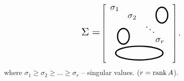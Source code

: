     \[
        \scalebox{1.5}{$\Sigma = $}
        \left[\begin{tabular}{clp{0.1cm}p{0.1cm}}
            \multicolumn{1}{l}{\scalebox{1.25}{$\sigma_1$}}        &         & & \multicolumn{1}{l}{\multirow{3}{*}{\begin{tikzpicture}[x=0.55pt,y=0.55pt,yscale=-1,xscale=1]
                    \draw  [line width=1.75]  (304.32,138.5) .. controls (312.66,138.5) and (319.43,147.68) .. (319.43,159) .. controls (319.43,170.32) and (312.66,179.5) .. (304.32,179.5) .. controls (295.98,179.5) and (289.21,170.32) .. (289.21,159) .. controls (289.21,147.68) and (295.98,138.5) .. (304.32,138.5) -- cycle ;
                    \end{tikzpicture}}} \\ %
\multicolumn{1}{l}{}         & \scalebox{1.25}{$\sigma_2$}       & \multicolumn{1}{c}{} & \multicolumn{1}{c}{}                     \\ %
            \multicolumn{2}{c}{\multirow{2}{*}{
                \begin{tikzpicture}[x=0.55pt,y=0.55pt,yscale=-1,xscale=1]
                    \draw  [line width=1.75]  (304.32,138.5) .. controls (312.66,138.5) and (319.43,147.68) .. (319.43,159) .. controls (319.43,170.32) and (312.66,179.5) .. (304.32,179.5) .. controls (295.98,179.5) and (289.21,170.32) .. (289.21,159) .. controls (289.21,147.68) and (295.98,138.5) .. (304.32,138.5) -- cycle ;
                    \end{tikzpicture}
            }} & \scalebox{1.25}{$\ddots$}              & \multicolumn{1}{l}{}  \\ %
            \multicolumn{2}{c}{}                   &                       & \multicolumn{1}{l}{\scalebox{1.25}{$\sigma_r$}}   \\[0.05cm] %
 
            \multicolumn{4}{c}{\begin{tikzpicture}[x=0.55pt,y=0.55pt,yscale=-1,xscale=1]
                \draw [line width=1.75]  (246,143.5) .. controls (246,133.56) and (273.41,125.5) .. (307.21,125.5) .. controls (341.02,125.5) and (368.43,133.56) .. (368.43,143.5) .. controls (368.43,153.44) and (341.02,161.5) .. (307.21,161.5) .. controls (273.41,161.5) and (246,153.44) .. (246,143.5) -- cycle ;
                \end{tikzpicture}
                }                                                                        
            \end{tabular}\right],
    \]
    where $\sigma_1 \geq \sigma_2 \geq \ldots \geq \sigma_r$ -- singular values. ($r = \operatorname{rank} A$).

